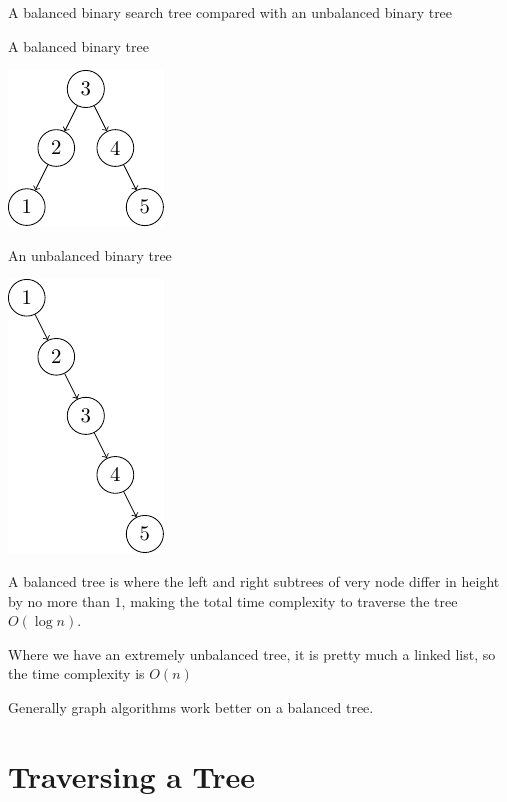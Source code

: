 \begin{highlight}{A balanced binary search tree compared with an unbalanced binary tree}
    \begin{minipage}{0.45\linewidth}
        \centering
        A balanced binary tree

        \includegraphics{lualatex/pa/8/balancedbst.pdf}
    \end{minipage}
    \hfill
    \begin{minipage}{0.45\linewidth}
        \centering
        An unbalanced binary tree

        \includegraphics{lualatex/pa/8/unbalancedbst.pdf}
    \end{minipage}
\end{highlight}

A balanced tree is where the left and right subtrees of very node differ in height by no more than \(1\), making the total time complexity to traverse the tree \(O(\log n)\).

Where we have an extremely unbalanced tree, it is pretty much a linked list, so the time complexity is \(O(n)\)
\begin{note}
    Generally graph algorithms work better on a balanced tree.
\end{note}

\section{Traversing a Tree}\label{sec:traversing_a_tree}

